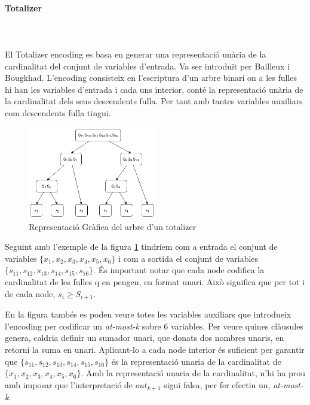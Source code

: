 \documentclass[11pt,a4paper,twoside]{report}
\begin{document}
  \paragraph*{Totalizer} ~\\~\\
  El Totalizer encoding es basa en generar una representació unària de la cardinalitat del conjunt de variables d'entrada. 
  Va ser introduït per Bailleux i Bougkhad\cite{Bailleux2003EfficientCE}. L'encoding consisteix en l'escriptura d'un arbre binari on a les fulles hi han les variables d'entrada i cada uns interior, 
  conté la representació unària de la cardinalitat dels seus descendents fulla. Per tant amb tantes variables auxiliars com descendents fulla tingui.

  \begin{figure}[ht!]
    \centering
    \includegraphics[width=0.5\textwidth]{Diagrames/totalizer.png}
    \caption{Representació Gràfica del arbre d'un totalizer}
    \label{fig:totalizer}
  \end{figure}

  Seguint amb l'exemple de la figura \ref{fig:totalizer} tindríem com a entrada el conjunt de variables $\{x_1, x_2, x_3, x_4, x_5, x_6\}$ i com a sortida el conjunt de variables $\{s_11, s_12, s_13, s_14, s_15, s_16\}$. És important notar que cada node codifica la cardinalitat de les fulles q en pengen, en format unari. Això significa que per tot i de cada node, $s_i \geq S_{i+1}$.

  En la figura tambés es poden veure totes les variables auxiliars que introdueix l'encoding per codificar un \textit{at-most-k} sobre 6 variables. Per veure quines clàusules genera, caldria definir un sumador unari, que donats dos nombres unaris, en retorni la suma en unari. 
  Aplicant-lo a cada node interior és suficient per garantir que $\{s_11, s_12, s_13, s_14, s_15, s_16\}$ és la representació unaria de la cardinalitat de $\{x_1, x_2, x_3, x_4, x_5, x_6\}$. 
  Amb la representació unaria de la cardinalitat, n'hi ha prou amb imposar que l'interpretació de $out_{k+1}$ sigui falsa, per fer efectiu un, \textit{at-most-k}. 
\end{document}
